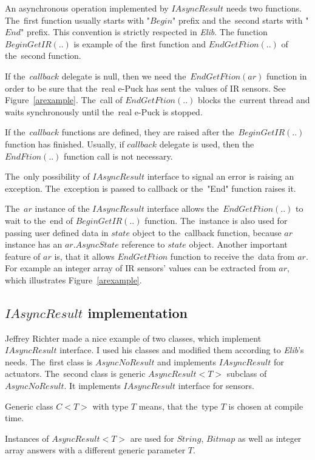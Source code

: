   An asynchronous operation implemented by $IAsyncResult$ needs two functions. 
  The~first function usually starts with 
  "$Begin$" prefix and the~second starts with "$End$" prefix. 
  This convention is strictly respected in {\it Elib}.
  The function $BeginGetIR(..)$ is example of the~first function and $EndGetFtion(..)$ of the~second function.

  If the~$callback$ delegate is null, then we need the~$EndGetFtion(ar)$ function
  in order to be sure that the~real e-Puck has sent the~values of IR sensors. 
  See Figure~\ref{arexample}.
  The~call of $EndGetFtion(..)$ blocks the~current thread and waits synchronously until the~real
  e-Puck is stopped.

  If the~$callback$ functions are defined, they are raised after the~$BeginGetIR(..)$ function has finished.
  Usually, if $callback$ delegate is used, then the~$EndFtion(..)$ function call is not necessary.

  The~only possibility of $IAsyncResult$ interface to signal an error is raising an exception.
  The~exception is passed to callback or the~"End" function raises it.

  The~$ar$ instance of the $IAsyncResult$ interface allows the~$EndGetFtion(..)$ to wait to the~end of $BeginGetIR(..)$ function.
  The~instance is also used for passing user defined data in $state$ object to the~callback function,
  because $ar$ instance has an $ar.AsyncState$ reference to $state$ object.
  Another important feature of $ar$ is, that it allows $EndGetFtion$ function to receive the~data
  from $ar$. For example an integer array of IR sensors' values can be extracted from $ar$, which illustrates Figure~\ref{arexample}.
  
\subsection{$IAsyncResult$ implementation} \label{sec:iasyncimpl}
  Jeffrey Richter \cite{IAsync} made a nice example of two classes, which implement $IAsyncResult$ interface.
  I used his classes and modified them according to {\it Elib}'s needs.
  The~first class is $AsyncNoResult$ and implements $IAsyncResult$ for actuators.
  The~second class is generic $AsyncResult<T>$ subclass of $AsyncNoResult$. 
  It implements $IAsyncResult$ interface for sensors.
  \begin{definition}
  Generic class $C<T>$ with type $T$ means, that the~type  $T$ is chosen at compile time. 
  \end{definition}
  Instances of $AsyncResult<T>$ are used
  for $String$, $Bitmap$ as well as integer array answers with a different generic parameter $T$.
    

